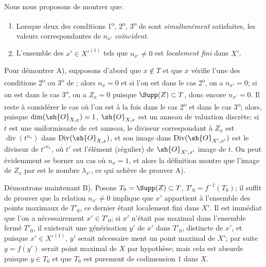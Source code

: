 \begin{env}[21.10.2]
\label{IV.21.10.2}
Nous nous proposons de montrer que:
\begin{enumerate}[label=\Alph*)]
  \item Lorsque deux des conditions 1\textsuperscript{o}, 2\textsuperscript{o}, 3\textsuperscript{o} de  sont \emph{simultanément} satisfaites, les valeurs correspondantes de $n_{x'}$ \emph{coïncident}.
  \item L'ensemble des $x'\in X'^{(1)}$ tels que $n_{x'}\neq0$ est \emph{localement fini} dans $X'$.
\end{enumerate}

Pour démontrer A), supposons d'abord que $x\notin T$ et que $x$ vérifie l'une des conditions 2\textsuperscript{o} ou 3\textsuperscript{o} de ;
alors $n_x=0$ et si l'on est dans le cas 2\textsuperscript{o}, on a $n_{x'}=0$;
si on est dans le cas 3\textsuperscript{o}, on a $Z_x=0$ puisque $\Supp(Z)\subset T$, donc encore $n_{x'}=0$.
Il reste à considérer le cas où l'on est à la fois dans le cas 2\textsuperscript{o} et dans le cas 3\textsuperscript{o};
alors, puisque $\dim(\sh{O}_{X,x})=1$, $\sh{O}_{X,x}$ est un anneau de valuation discrète;
si $t$ est une uniformisante de cet anneau, le diviseur correspondant à $Z_x$ est $\operatorname{div}(t^{n_x})$ dans $\operatorname{Div}(\sh{O}_{X,x})$, et son image dans $\operatorname{Div}(\sh{O}_{X',x'})$ est le diviseur de $t'^{n_x}$, où $t'$ est l'élément (régulier) de $\sh{O}_{X',x'}$ image de $t$.
On peut évidemment se borner au cas où $n_x=1$, et alors la définition  montre que l'image de $Z_x$ par  est le nombre $\lambda_{x'}$, ce qui achève de prouver A).

Démontrons maintenant B).
Posons $T_0=\Supp(Z)\subset T$, $T'_0=f^{-1}(T_0)$;
il suffit de prouver que la relation $n_{x'}\neq0$ implique que $x'$ appartient à l'ensemble des points maximaux de $T'_0$, ce dernier étant localement fini dans $X'$.
Il est immédiat que l'on a nécessairement $x'\in T'_0$;
si $x'$ n'était pas maximal dans l'ensemble fermé $T'_0$, il existerait
une générisation $y'$ de $x'$ dans $T'_0$, distincte de $x'$, et puisque $x'\in X'^{(1)}$, $y'$ serait nécessaire%
ment un point maximal de $X'$;
par suite $y=f(y')$ serait point maximal de $X$ par hypothèse;
mais cela est absurde puisque $y\in T_0$ et que $T_0$ est purement de codimension $1$ dans $X$.
\end{env}

